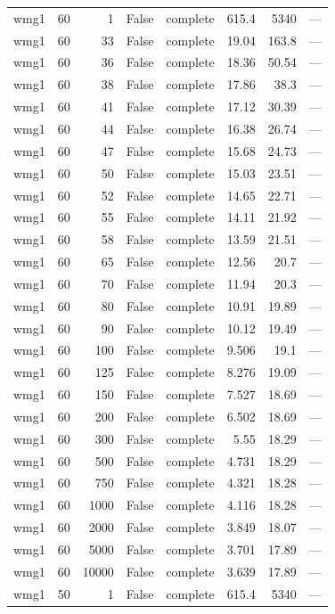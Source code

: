 \begin{tabular}{lrrrlrrl}
wmg1 & 60 & 1 & False & complete & 615.4 & 5340 & — \\
wmg1 & 60 & 33 & False & complete & 19.04 & 163.8 & — \\
wmg1 & 60 & 36 & False & complete & 18.36 & 50.54 & — \\
wmg1 & 60 & 38 & False & complete & 17.86 & 38.3 & — \\
wmg1 & 60 & 41 & False & complete & 17.12 & 30.39 & — \\
wmg1 & 60 & 44 & False & complete & 16.38 & 26.74 & — \\
wmg1 & 60 & 47 & False & complete & 15.68 & 24.73 & — \\
wmg1 & 60 & 50 & False & complete & 15.03 & 23.51 & — \\
wmg1 & 60 & 52 & False & complete & 14.65 & 22.71 & — \\
wmg1 & 60 & 55 & False & complete & 14.11 & 21.92 & — \\
wmg1 & 60 & 58 & False & complete & 13.59 & 21.51 & — \\
wmg1 & 60 & 65 & False & complete & 12.56 & 20.7 & — \\
wmg1 & 60 & 70 & False & complete & 11.94 & 20.3 & — \\
wmg1 & 60 & 80 & False & complete & 10.91 & 19.89 & — \\
wmg1 & 60 & 90 & False & complete & 10.12 & 19.49 & — \\
wmg1 & 60 & 100 & False & complete & 9.506 & 19.1 & — \\
wmg1 & 60 & 125 & False & complete & 8.276 & 19.09 & — \\
wmg1 & 60 & 150 & False & complete & 7.527 & 18.69 & — \\
wmg1 & 60 & 200 & False & complete & 6.502 & 18.69 & — \\
wmg1 & 60 & 300 & False & complete & 5.55 & 18.29 & — \\
wmg1 & 60 & 500 & False & complete & 4.731 & 18.29 & — \\
wmg1 & 60 & 750 & False & complete & 4.321 & 18.28 & — \\
wmg1 & 60 & 1000 & False & complete & 4.116 & 18.28 & — \\
wmg1 & 60 & 2000 & False & complete & 3.849 & 18.07 & — \\
wmg1 & 60 & 5000 & False & complete & 3.701 & 17.89 & — \\
wmg1 & 60 & 10000 & False & complete & 3.639 & 17.89 & — \\
wmg1 & 50 & 1 & False & complete & 615.4 & 5340 & — \\

\end{tabular}
